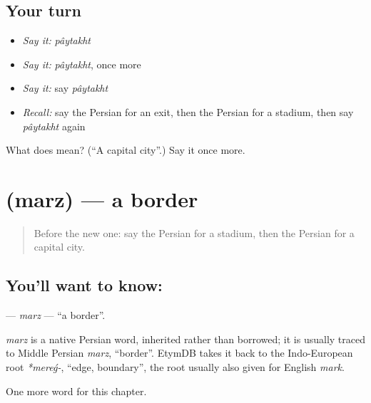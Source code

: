 \subsection*{Your turn}
\begin{itemize}
\raggedright
  \item \emph{Say it:} \emph{pâytakht}
  \item \emph{Say it:} \emph{pâytakht}, once more
  \item \emph{Say it:} say \emph{pâytakht}
  \item \emph{Recall:} say the Persian for an exit, then the Persian for a stadium, then say \emph{pâytakht} again
\end{itemize}

\begin{tcolorbox}[breakable,colback=teal!4,colframe=teal!35!black,title={Before you move on}]
What does  mean? (\textquotedblleft{}A capital city\textquotedblright{}.) Say it once more.
\end{tcolorbox}
\section[\texorpdfstring{\fa{مرز} (marz)}{مرز (marz)}]{ (marz) — a border}

\label{lesson:FA-C267-marz}



\begin{quote}
Before the new one: say the Persian for a stadium, then the Persian for a capital city.
\end{quote}

\subsection*{You'll want to know: }
\textbf{} — \emph{marz} — \textquotedblleft{}a border\textquotedblright{}.

\begin{cousinweb}
\emph{marz} is a native Persian word, inherited rather than borrowed; it is usually traced to Middle Persian \emph{marz}, \textquotedblleft{}border\textquotedblright{}. EtymDB takes it back to the Indo-European root \emph{*mereǵ-}, \textquotedblleft{}edge, boundary\textquotedblright{}, the root usually also given for English \emph{mark}.
\end{cousinweb}

\begin{grammarlens}[title={What you've built}]
One more word for this chapter.
\end{grammarlens}


